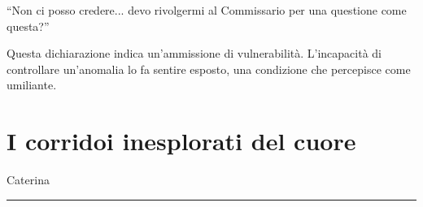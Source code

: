 \begin{dialogue}
 \enquote{Non ci posso credere... devo rivolgermi al Commissario per una questione come questa?}
\end{dialogue}

Questa dichiarazione indica un'ammissione di vulnerabilità. L'incapacità di controllare un'anomalia lo fa sentire esposto, una condizione che percepisce come umiliante.

\newpage
\section{I corridoi inesplorati del cuore}


\begin{center}
\begin{minipage}{0.7\textwidth}
    \centering
\end{minipage}
\end{center}

\vspace{1em}
\begin{center}Caterina\end{center}
\hrule
\vspace{1em}

